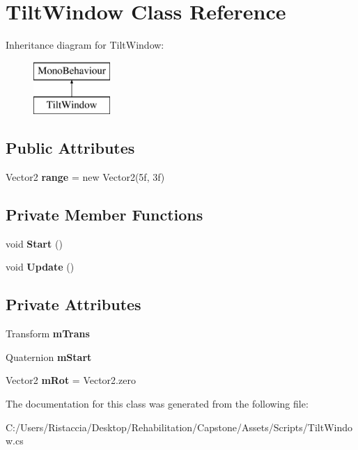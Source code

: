 \hypertarget{class_tilt_window}{}\section{Tilt\+Window Class Reference}
\label{class_tilt_window}
Inheritance diagram for Tilt\+Window\+:\begin{figure}[H]
\begin{center}
\leavevmode
\includegraphics[height=2.000000cm]{class_tilt_window}
\end{center}
\end{figure}
\subsection*{Public Attributes}
\begin{DoxyCompactItemize}
\item 
\mbox{\label{class_tilt_window_ac6a1e9f7053fbdcf079cb86b027e41d2}} 
Vector2 {\bfseries range} = new Vector2(5f, 3f)
\end{DoxyCompactItemize}
\subsection*{Private Member Functions}
\begin{DoxyCompactItemize}
\item 
\mbox{\label{class_tilt_window_afdaabdf72aefb1c002b12b37f2a84b42}} 
void {\bfseries Start} ()
\item 
\mbox{\label{class_tilt_window_a0d5548894a52f2b4a79469e54524f25c}} 
void {\bfseries Update} ()
\end{DoxyCompactItemize}
\subsection*{Private Attributes}
\begin{DoxyCompactItemize}
\item 
\mbox{\label{class_tilt_window_ab1d5bc4df4ace2b39c9f79948f00904b}} 
Transform {\bfseries m\+Trans}
\item 
\mbox{\label{class_tilt_window_a3cbf0dc5fe2d64d61149d7f211c0bd3f}} 
Quaternion {\bfseries m\+Start}
\item 
\mbox{\label{class_tilt_window_adf78c3e287aaea670076e4f604939eb4}} 
Vector2 {\bfseries m\+Rot} = Vector2.\+zero
\end{DoxyCompactItemize}


The documentation for this class was generated from the following file\+:\begin{DoxyCompactItemize}
\item 
C\+:/\+Users/\+Ristaccia/\+Desktop/\+Rehabilitation/\+Capstone/\+Assets/\+Scripts/Tilt\+Window.\+cs\end{DoxyCompactItemize}
